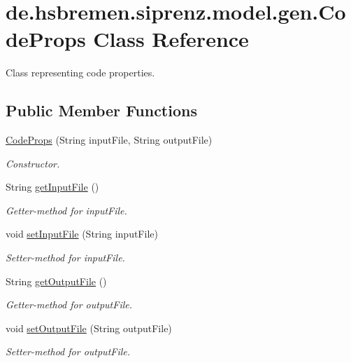 \hypertarget{classde_1_1hsbremen_1_1siprenz_1_1model_1_1gen_1_1CodeProps}{}\section{de.\+hsbremen.\+siprenz.\+model.\+gen.\+Code\+Props Class Reference}
\label{classde_1_1hsbremen_1_1siprenz_1_1model_1_1gen_1_1CodeProps}


Class representing code properties.  


\subsection*{Public Member Functions}
\begin{DoxyCompactItemize}
\item 
\hyperlink{classde_1_1hsbremen_1_1siprenz_1_1model_1_1gen_1_1CodeProps_aa966a1d1a7572209a165ecc5de3c59e9}{Code\+Props} (String input\+File, String output\+File)
\begin{DoxyCompactList}\small\item\em Constructor. \end{DoxyCompactList}\item 
String \hyperlink{classde_1_1hsbremen_1_1siprenz_1_1model_1_1gen_1_1CodeProps_a3e1ec80957d2d8737681ddf4f7e54b73}{get\+Input\+File} ()
\begin{DoxyCompactList}\small\item\em Getter-\/method for input\+File. \end{DoxyCompactList}\item 
void \hyperlink{classde_1_1hsbremen_1_1siprenz_1_1model_1_1gen_1_1CodeProps_a2684b89f518f036e177a8a2569f2974f}{set\+Input\+File} (String input\+File)
\begin{DoxyCompactList}\small\item\em Setter-\/method for input\+File. \end{DoxyCompactList}\item 
String \hyperlink{classde_1_1hsbremen_1_1siprenz_1_1model_1_1gen_1_1CodeProps_afe1ad57f346be19f273642dad6ecea3b}{get\+Output\+File} ()
\begin{DoxyCompactList}\small\item\em Getter-\/method for output\+File. \end{DoxyCompactList}\item 
void \hyperlink{classde_1_1hsbremen_1_1siprenz_1_1model_1_1gen_1_1CodeProps_a067699d7b7af723e5e31a99bcc4484cb}{set\+Output\+File} (String output\+File)
\begin{DoxyCompactList}\small\item\em Setter-\/method for output\+File. \end{DoxyCompactList}\end{DoxyCompactItemize}


